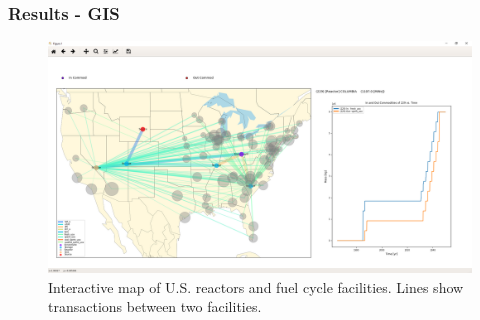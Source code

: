 \begin{frame}
    \frametitle{Results - GIS}
    \begin{figure}[htbp!]
        \begin{center}
                \includegraphics[width=\textwidth]{./images/sim_output/us/map.png}
        \end{center}
    \caption{Interactive map of U.S. reactors and fuel cycle
     facilities. Lines show transactions between two facilities.}
    \end{figure}
\end{frame}

